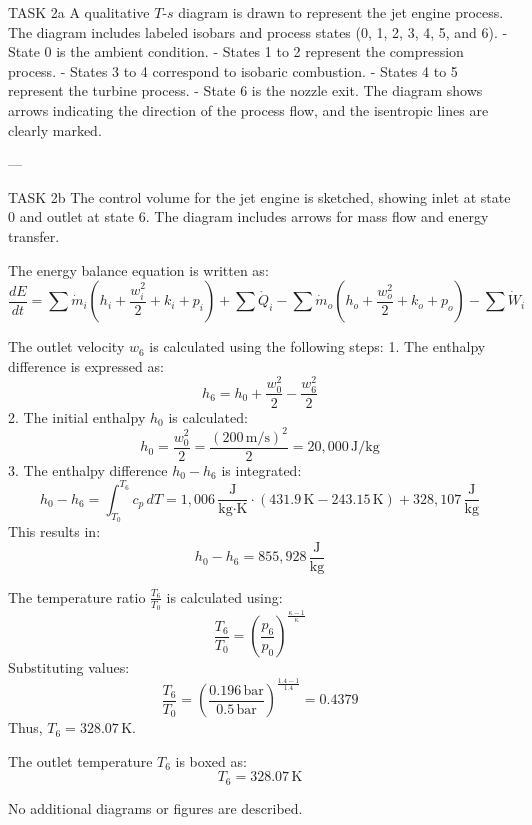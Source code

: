 TASK 2a  
A qualitative \( T \)-\( s \) diagram is drawn to represent the jet engine process. The diagram includes labeled isobars and process states (0, 1, 2, 3, 4, 5, and 6).  
- State 0 is the ambient condition.  
- States 1 to 2 represent the compression process.  
- States 3 to 4 correspond to isobaric combustion.  
- States 4 to 5 represent the turbine process.  
- State 6 is the nozzle exit.  
The diagram shows arrows indicating the direction of the process flow, and the isentropic lines are clearly marked.  

---

TASK 2b  
The control volume for the jet engine is sketched, showing inlet at state 0 and outlet at state 6. The diagram includes arrows for mass flow and energy transfer.  

The energy balance equation is written as:  
\[
\frac{dE}{dt} = \sum \dot{m}_i \left( h_i + \frac{w_i^2}{2} + k_i + p_i \right) + \sum \dot{Q}_i - \sum \dot{m}_o \left( h_o + \frac{w_o^2}{2} + k_o + p_o \right) - \sum \dot{W}_i
\]

The outlet velocity \( w_6 \) is calculated using the following steps:  
1. The enthalpy difference is expressed as:  
\[
h_6 = h_0 + \frac{w_0^2}{2} - \frac{w_6^2}{2}
\]  
2. The initial enthalpy \( h_0 \) is calculated:  
\[
h_0 = \frac{w_0^2}{2} = \frac{(200 \, \text{m/s})^2}{2} = 20,000 \, \text{J/kg}
\]  
3. The enthalpy difference \( h_0 - h_6 \) is integrated:  
\[
h_0 - h_6 = \int_{T_0}^{T_6} c_p \, dT = 1,006 \, \frac{\text{J}}{\text{kg·K}} \cdot (431.9 \, \text{K} - 243.15 \, \text{K}) + 328,107 \, \frac{\text{J}}{\text{kg}}
\]  
This results in:  
\[
h_0 - h_6 = 855,928 \, \frac{\text{J}}{\text{kg}}
\]

The temperature ratio \( \frac{T_6}{T_0} \) is calculated using:  
\[
\frac{T_6}{T_0} = \left( \frac{p_6}{p_0} \right)^{\frac{\kappa - 1}{\kappa}}
\]  
Substituting values:  
\[
\frac{T_6}{T_0} = \left( \frac{0.196 \, \text{bar}}{0.5 \, \text{bar}} \right)^{\frac{1.4 - 1}{1.4}} = 0.4379
\]  
Thus, \( T_6 = 328.07 \, \text{K} \).  

The outlet temperature \( T_6 \) is boxed as:  
\[
T_6 = 328.07 \, \text{K}
\]  

No additional diagrams or figures are described.